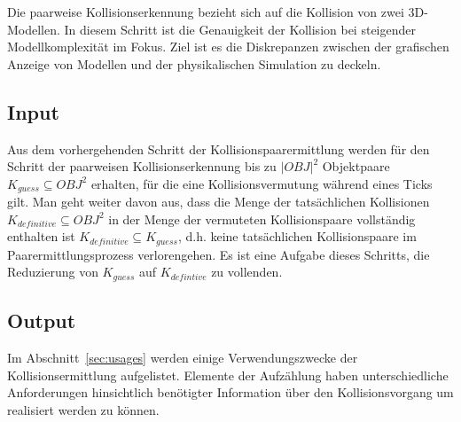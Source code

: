 Die paarweise Kollisionserkennung bezieht sich auf die Kollision von zwei 3D-Modellen. In diesem Schritt ist die Genauigkeit der Kollision bei steigender Modellkomplexität im Fokus.
Ziel ist es die Diskrepanzen zwischen der grafischen Anzeige von Modellen und der physikalischen Simulation zu deckeln.
\subsection{Input}
Aus dem vorhergehenden Schritt der Kollisionspaarermittlung werden für den Schritt der paarweisen Kollisionserkennung bis zu  $|OBJ|^2$ Objektpaare $K_{guess}\subseteq OBJ^2$ erhalten, für die eine Kollisionsvermutung während eines Ticks gilt. Man geht weiter davon aus, dass die Menge der tatsächlichen Kollisionen $K_{definitive}\subseteq OBJ^2$ in der Menge der vermuteten Kollisionspaare  vollständig enthalten ist $K_{definitive}\subseteq K_{guess}$, d.h. keine tatsächlichen Kollisionspaare im Paarermittlungsprozess verlorengehen. Es ist eine Aufgabe dieses Schritts, die Reduzierung von $K_{guess}$ auf $K_{defintive}$ zu vollenden.

\subsection{Output}
Im Abschnitt~\ref{sec:usages} werden einige Verwendungszwecke der Kollisionsermittlung aufgelistet. 
Elemente der Aufzählung haben unterschiedliche Anforderungen hinsichtlich benötigter Information über den Kollisionsvorgang um realisiert werden zu können.

